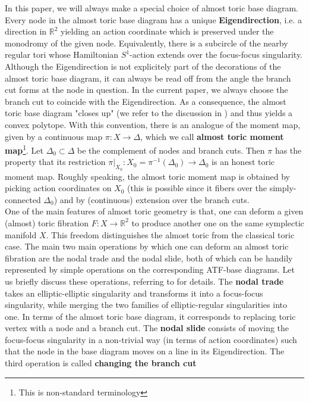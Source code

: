 \documentclass[12pt,a4paper,draft]{scrartcl}
\begin{document}
In this paper, we will always make a special choice of almost toric base diagram. Every node in the almost toric base diagram has a unique \textbf{Eigendirection}, i.e. a direction in $\mathbb{R}^2$ yielding an action coordinate which is preserved under the monodromy of the given node. Equivalently, there is a subcircle of the nearby regular tori whose Hamiltonian $S^1$-action extends over the focus-focus singularity. Although the Eigendirection is not explicitely part of the decorations of the almost toric base diagram, it can always be read off from the angle the branch cut forms at the node in question. In the current paper, we always choose the branch cut to coincide with the Eigendirection. As a consequence, the almost toric base diagram "closes up" (we refer to the discussion in \cite[7.2]{evans2021atfs}) and thus yields a convex polytope. With this convention, there is an analogue of the moment map, given by a continuous map $\pi \colon X \rightarrow \Delta$, which we call \textbf{almost toric moment map}\footnote{This is non-standard terminology}. Let $\Delta_0 \subset \Delta$ be the complement of nodes and branch cuts. Then $\pi$ has the property that its restriction $\pi\vert_{X_0} \colon X_0 = \pi^{-1}(\Delta_0) \rightarrow \Delta_0$ is an honest toric moment map. Roughly speaking, the almost toric moment map is obtained by picking action coordinates on $X_0$ (this is possible since it fibers over the simply-connected $\Delta_0$) and by (continuous) extension over the branch cuts. \\

One of the main features of almost toric geometry is that, one can deform a given (almost) toric fibration $F \colon X \rightarrow \mathbb{R}^2$ to produce another one on the same symplectic manifold $X$. This freedom distinguishes the almost toric from the classical toric case. The main two main operations by which one can deform an almost toric fibration are the nodal trade and the nodal slide, both of which can be handily represented by simple operations on the corresponding ATF-base diagrams. Let us briefly discuss these operations, referring to \cite[Sections 8.2-8.3]{evans2021atfs} for details. The \textbf{nodal trade} takes an elliptic-elliptic singularity and transforms it into a focus-focus singularity, while merging the two families of elliptic-regular singularities into one. In terms of the almost toric base diagram, it corresponds to replacing toric vertex with a node and a branch cut. The \textbf{nodal slide} consists of moving the focus-focus singularity in a non-trivial way (in terms of action coordinates) such that the node in the base diagram moves on a line in its Eigendirection. The third operation is called \textbf{changing the branch cut}
\end{document}
